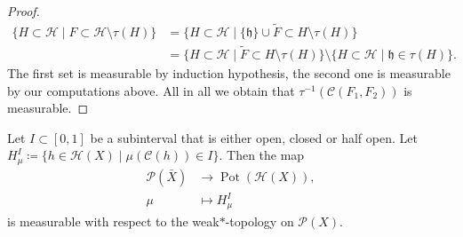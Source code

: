 \begin{proof}
  \begin{align*}
    \{H \subset \mathcal{H} \mid F \subset \mathcal{H} \setminus \tau(H)\}
    & = \{H \subset \mathcal{H} \mid \{\mathfrak{h}\} \cup \tilde F \subset H \setminus \tau(H)\}\\
    & = \{H \subset \mathcal{H} \mid \tilde{F} \subset H \setminus \tau(H)\} \setminus \{H \subset \mathcal{H} \mid \mathfrak{h} \in \tau(H)\}.
  \end{align*}
  The first set is measurable by induction hypothesis, the second one is measurable by our computations above. All in all we obtain that \(\tau^{-1}(\mathcal{C}(F_1, F_2))\) is measurable.
\end{proof}


\begin{lemma}[{\cites[Lemma~ A.1]{MR3509968}}]
  \label{lem:measurable-mu}
  Let \(I \subset [0,1]\) be a subinterval that is either open, closed or half open. Let \(H^I_\mu \coloneqq \{h \in \mathcal{H}(X) \mid \mu(\mathcal{C}(h)) \in I\}\). Then the map
  \begin{align*}
    \mathcal{P}(\bar X) &\to \operatorname{Pot}(\mathcal{H}(X)),\\
    \mu &\mapsto H^I_\mu
  \end{align*}
  is measurable with respect to the weak\(\ast\)-topology on \(\mathcal{P}(X)\).
\end{lemma}

